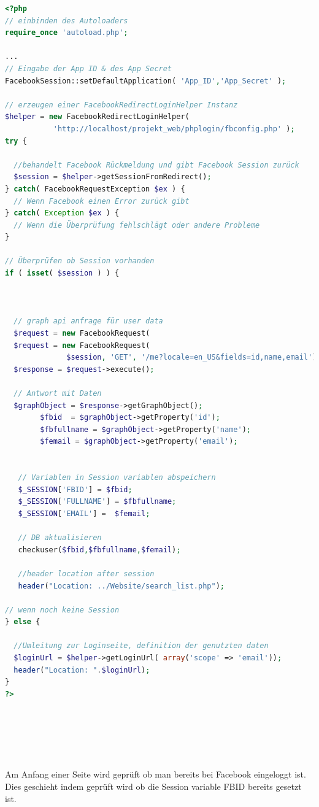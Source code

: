 \documentclass[11pt,a4paper]{scrreprt}
\begin{document}
\begin{lstlisting}[language=PHP, frame=single, captionpos=b,caption= fbconfig.php]
<?php
// einbinden des Autoloaders
require_once 'autoload.php';

...
// Eingabe der App ID & des App Secret
FacebookSession::setDefaultApplication( 'App_ID','App_Secret' );

// erzeugen einer FacebookRedirectLoginHelper Instanz
$helper = new FacebookRedirectLoginHelper(
           'http://localhost/projekt_web/phplogin/fbconfig.php' );
try {

  //behandelt Facebook Rückmeldung und gibt Facebook Session zurück
  $session = $helper->getSessionFromRedirect();
} catch( FacebookRequestException $ex ) {
  // Wenn Facebook einen Error zurück gibt
} catch( Exception $ex ) {
  // Wenn die Überprüfung fehlschlägt oder andere Probleme
}

// Überprüfen ob Session vorhanden
if ( isset( $session ) ) {



  // graph api anfrage für user data
  $request = new FacebookRequest( 
  $request = new FacebookRequest( 
              $session, 'GET', '/me?locale=en_US&fields=id,name,email');
  $response = $request->execute();
  
  // Antwort mit Daten
  $graphObject = $response->getGraphObject();
        $fbid  = $graphObject->getProperty('id');
        $fbfullname = $graphObject->getProperty('name');
        $femail = $graphObject->getProperty('email');    

	    
   // Variablen in Session variablen abspeichern
   $_SESSION['FBID'] = $fbid;           
   $_SESSION['FULLNAME'] = $fbfullname;
   $_SESSION['EMAIL'] =  $femail;
    
   // DB aktualisieren
   checkuser($fbid,$fbfullname,$femail);
    
   //header location after session
   header("Location: ../Website/search_list.php");

// wenn noch keine Session   
} else {

  //Umleitung zur Loginseite, definition der genutzten daten
  $loginUrl = $helper->getLoginUrl( array('scope' => 'email'));
  header("Location: ".$loginUrl);
}
?>




 	    
\end{lstlisting}

\noindent
Am Anfang einer Seite wird geprüft ob man bereits bei Facebook eingeloggt ist. Dies geschieht indem geprüft wird ob die Session variable FBID bereits gesetzt ist.
\end{document}
